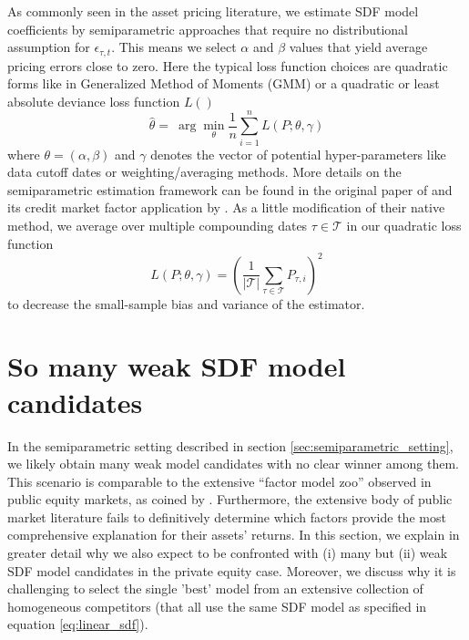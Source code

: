 \documentclass[12pt]{article}
\begin{document}
As commonly seen in the asset pricing literature, we estimate SDF model coefficients by semiparametric approaches that require no distributional assumption for $\epsilon_{\tau,t}$.
This means we select $\alpha$ and $\beta$ values that yield average pricing errors close to zero. 
Here the typical loss function choices are quadratic forms like in Generalized Method of Moments (GMM) or a quadratic or least absolute deviance loss function $L()$
\begin{equation}
\label{eq:minimization_estimation}
\hat{\theta } = \
\arg \min_{\theta} \frac{1}{n} \sum_{i=1}^n L \left( P ; \theta, \gamma \right)
\end{equation}
where $\theta=(\alpha,\beta)$ and $\gamma$ denotes the vector of potential hyper-parameters like data cutoff dates or weighting/averaging methods.
More details on the semiparametric estimation framework can be found in the original paper of \cite{DLP12} and its credit market factor application by \cite{HSS23}.
As a little modification of their native method, we average over multiple compounding dates $\tau \in \mathcal{T}$ in our quadratic loss function
\begin{equation}
	\label{eq:quadratic_loss}
	L \left( P ; \theta, \gamma \right) = \left( \frac{1}{|\mathcal{T}|} \sum_{\tau \in \mathcal{T}} P_{\tau,i}  \right)^2
\end{equation}
to decrease the small-sample bias and variance of the estimator.


\section{So many weak SDF model candidates}
\label{sec:model_selection}

In the semiparametric setting described in section \ref{sec:semiparametric_setting}, we likely obtain many weak model candidates with no clear winner among them.
This scenario is comparable to the extensive ``factor model zoo'' observed in public equity markets, as coined by \cite{C11,FGX20}. Furthermore, the extensive body of public market literature fails to definitively determine which factors provide the most comprehensive explanation for their assets' returns.
In this section, we explain in greater detail why we also expect to be confronted with (i) many but (ii) weak SDF model candidates in the private equity case.
Moreover, we discuss why it is challenging to select the single 'best' model from an extensive collection of homogeneous competitors (that all use the same SDF model as specified in equation \ref{eq:linear_sdf}).
\end{document}
